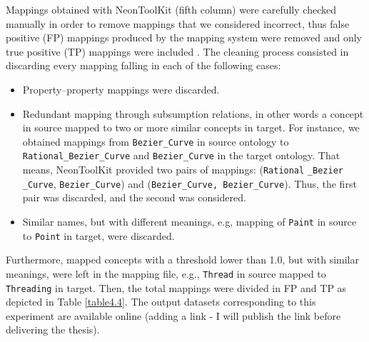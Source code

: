 Mappings obtained with NeonToolKit (fifth column) were carefully checked manually in order to remove mappings that we considered incorrect, thus    false positive (FP) mappings produced by the mapping system were removed and only true positive (TP) mappings were included \citep{oliver_kutz_chinese_2010}. The cleaning process consisted in discarding every mapping falling in each of the following cases:

\begin{itemize}
	
	\item Property–property mappings were discarded.  
	
	\item \cbstart Redundant mapping through subsumption relations, in other words a concept in source mapped to two or more similar concepts in target. For instance, we obtained mappings  from \texttt{Bezier\_Curve} in source ontology to \texttt{Rational\_Bezier\_Curve} and \texttt{Bezier\_Curve} in the target ontology. That means, NeonToolKit provided two pairs of mappings: (\texttt{Rational} \texttt{\_Bezier} \texttt{\_Curve}, \texttt{Bezier\_Curve}) and (\texttt{Bezier\_Curve, Bezier\_Curve}). Thus, the first pair was discarded, and the second was considered. \cbend 
	
	\item Similar names, but with different meanings, e.g, mapping of \texttt{Paint} in source to \texttt{Point} in target, were discarded.
	
\end{itemize}


Furthermore, mapped concepts with a threshold lower than 1.0, but with similar meanings, were left in the mapping file, e.g., \texttt{Thread} in source mapped to \texttt{Threading} in target. Then, the total mappings were divided in FP and TP as depicted in Table \ref{table4.4}. The  output datasets corresponding to this experiment are available online (adding a link - I will publish the link before delivering the thesis).  


